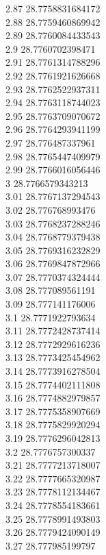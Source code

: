 {2.87	28.7758831684172\\
2.88	28.7759460869942\\
2.89	28.7760084433543\\
2.9	28.7760702398471\\
2.91	28.7761314788296\\
2.92	28.7761921626668\\
2.93	28.7762522937311\\
2.94	28.7763118744023\\
2.95	28.7763709070672\\
2.96	28.7764293941199\\
2.97	28.776487337961\\
2.98	28.7765447409979\\
2.99	28.7766016056446\\
3	28.7766579343213\\
3.01	28.7767137294543\\
3.02	28.776768993476\\
3.03	28.7768237288246\\
3.04	28.7768779379438\\
3.05	28.7769316232829\\
3.06	28.7769847872966\\
3.07	28.7770374324444\\
3.08	28.777089561191\\
3.09	28.777141176006\\
3.1	28.7771922793634\\
3.11	28.7772428737414\\
3.12	28.7772929616236\\
3.13	28.7773425454962\\
3.14	28.7773916278504\\
3.15	28.7774402111808\\
3.16	28.7774882979857\\
3.17	28.7775358907669\\
3.18	28.7775829920294\\
3.19	28.7776296042813\\
3.2	28.7776757300337\\
3.21	28.7777213718007\\
3.22	28.7777665320987\\
3.23	28.7778112134467\\
3.24	28.7778554183661\\
3.25	28.7778991493803\\
3.26	28.7779424090149\\
3.27	28.777985199797\\
}
